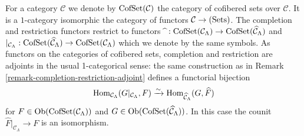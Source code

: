 \begin{remark}
\label{remark-completion-restriction-cofset-adjoint}
For a category $\mathcal C$ we denote by $\textnormal{CofSet}(\mathcal C)$ the 
category of cofibered sets over $\mathcal C$.  It is a $1$-category isomorphic 
the category of functors $\mathcal C \rightarrow \textnormal{(Sets)}$.  The 
completion and restriction functors restrict to functors $\widehat{~}: 
\textnormal{CofSet}(\mathcal C_{\Lambda}) \rightarrow 
\textnormal{CofSet}(\widehat{\mathcal C}_{\Lambda})$ and $|_{\mathcal 
C_{\Lambda}}: \textnormal{CofSet}(\widehat{\mathcal C}_{\Lambda}) \rightarrow 
\textnormal{CofSet}(\mathcal C_{\Lambda})$ which we denote by the same symbols. 
 As functors on the categories of cofibered sets, completion and restriction 
are adjoints in the usual 1-categorical sense: the same construction as in 
Remark \ref{remark-completion-restriction-adjoint} defines a functorial 
bijection
\[ 
\textnormal{Hom}_{\mathcal C_{\Lambda}}(G|_{\mathcal C_{\Lambda}}, F) 
\xrightarrow{\sim} 
\textnormal{Hom}_{\widehat{\mathcal C}_{\Lambda}}(G, \widehat{F}) 
\]
for $F \in \textnormal{Ob}(\textnormal{CofSet}(\mathcal C_{\Lambda}))$ and $G 
\in \textnormal{Ob}(\textnormal{CofSet}(\widehat{\mathcal C}_{\Lambda}))$.  In 
this case the counit $\widehat{F}|_{\mathcal C_{\Lambda}} \rightarrow F$ is an 
isomorphism.
\end{remark}

